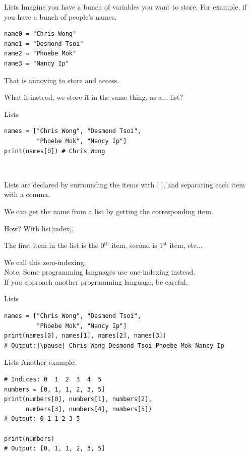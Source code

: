 \documentclass[dvipsnames, svgnames, x11names, handout]{beamer}
\begin{document}
\begin{frame}[fragile]{Lists}
Imagine you have a bunch of variables you want to store.
For example, if you have a bunch of people's names.
\begin{verbatim}
name0 = "Chris Wong"
name1 = "Desmond Tsoi"
name2 = "Phoebe Mok"
name3 = "Nancy Ip"
\end{verbatim}
That is annoying to store and access.

\pause What if instead, we store it in the same thing, as a... \pause list?
\end{frame}

\begin{frame}[fragile]{Lists}
\begin{verbatim}
names = ["Chris Wong", "Desmond Tsoi",
         "Phoebe Mok", "Nancy Ip"]
print(names[0]) # Chris Wong
\end{verbatim}

\

Lists are declared by surrounding the items with [ ], and separating each item with a comma.

We can get the name from a list by getting the corresponding item.

How? With list[index].

The first item in the list is the 0$^{\text{th}}$ item, second is 1$^{\text{st}}$ item, etc... 

We call this zero-indexing.\\

{\tiny Note: Some programming languages use one-indexing instead.\\[-1em]

\hspace{2.5em} If you approach another programming language, be careful.}
\end{frame}

\begin{frame}[fragile]{Lists}
\begin{verbatim}
names = ["Chris Wong", "Desmond Tsoi",
         "Phoebe Mok", "Nancy Ip"]
print(names[0], names[1], names[2], names[3]) 
# Output:|\pause| Chris Wong Desmond Tsoi Phoebe Mok Nancy Ip
\end{verbatim}
\end{frame}

\begin{frame}[fragile]{Lists}
Another example:
\begin{verbatim}
# Indices: 0  1  2  3  4  5
numbers = [0, 1, 1, 2, 3, 5]
print(numbers[0], numbers[1], numbers[2],
      numbers[3], numbers[4], numbers[5]) 
# Output: 0 1 1 2 3 5

print(numbers)
# Output: [0, 1, 1, 2, 3, 5]
\end{verbatim}
\end{frame}
\end{document}
